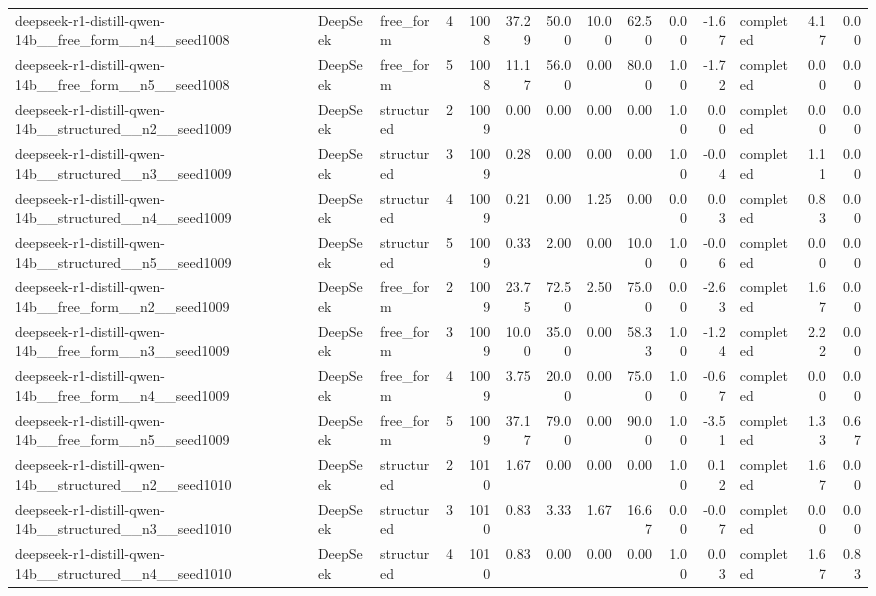 \begin{longtable}{lllrrrrrrrrlrr}
deepseek-r1-distill-qwen-14b\_\_free\_form\_\_n4\_\_seed1008 & DeepSeek & free\_form & 4 & 1008 & 37.29 & 50.00 & 10.00 & 62.50 & 0.00 & -1.67 & completed & 4.17 & 0.00 \\
deepseek-r1-distill-qwen-14b\_\_free\_form\_\_n5\_\_seed1008 & DeepSeek & free\_form & 5 & 1008 & 11.17 & 56.00 & 0.00 & 80.00 & 1.00 & -1.72 & completed & 0.00 & 0.00 \\
deepseek-r1-distill-qwen-14b\_\_structured\_\_n2\_\_seed1009 & DeepSeek & structured & 2 & 1009 & 0.00 & 0.00 & 0.00 & 0.00 & 1.00 & 0.00 & completed & 0.00 & 0.00 \\
deepseek-r1-distill-qwen-14b\_\_structured\_\_n3\_\_seed1009 & DeepSeek & structured & 3 & 1009 & 0.28 & 0.00 & 0.00 & 0.00 & 1.00 & -0.04 & completed & 1.11 & 0.00 \\
deepseek-r1-distill-qwen-14b\_\_structured\_\_n4\_\_seed1009 & DeepSeek & structured & 4 & 1009 & 0.21 & 0.00 & 1.25 & 0.00 & 0.00 & 0.03 & completed & 0.83 & 0.00 \\
deepseek-r1-distill-qwen-14b\_\_structured\_\_n5\_\_seed1009 & DeepSeek & structured & 5 & 1009 & 0.33 & 2.00 & 0.00 & 10.00 & 1.00 & -0.06 & completed & 0.00 & 0.00 \\
deepseek-r1-distill-qwen-14b\_\_free\_form\_\_n2\_\_seed1009 & DeepSeek & free\_form & 2 & 1009 & 23.75 & 72.50 & 2.50 & 75.00 & 0.00 & -2.63 & completed & 1.67 & 0.00 \\
deepseek-r1-distill-qwen-14b\_\_free\_form\_\_n3\_\_seed1009 & DeepSeek & free\_form & 3 & 1009 & 10.00 & 35.00 & 0.00 & 58.33 & 1.00 & -1.24 & completed & 2.22 & 0.00 \\
deepseek-r1-distill-qwen-14b\_\_free\_form\_\_n4\_\_seed1009 & DeepSeek & free\_form & 4 & 1009 & 3.75 & 20.00 & 0.00 & 75.00 & 1.00 & -0.67 & completed & 0.00 & 0.00 \\
deepseek-r1-distill-qwen-14b\_\_free\_form\_\_n5\_\_seed1009 & DeepSeek & free\_form & 5 & 1009 & 37.17 & 79.00 & 0.00 & 90.00 & 1.00 & -3.51 & completed & 1.33 & 0.67 \\
deepseek-r1-distill-qwen-14b\_\_structured\_\_n2\_\_seed1010 & DeepSeek & structured & 2 & 1010 & 1.67 & 0.00 & 0.00 & 0.00 & 1.00 & 0.12 & completed & 1.67 & 0.00 \\
deepseek-r1-distill-qwen-14b\_\_structured\_\_n3\_\_seed1010 & DeepSeek & structured & 3 & 1010 & 0.83 & 3.33 & 1.67 & 16.67 & 0.00 & -0.07 & completed & 0.00 & 0.00 \\
deepseek-r1-distill-qwen-14b\_\_structured\_\_n4\_\_seed1010 & DeepSeek & structured & 4 & 1010 & 0.83 & 0.00 & 0.00 & 0.00 & 1.00 & 0.03 & completed & 1.67 & 0.83 \\

\end{longtable}
